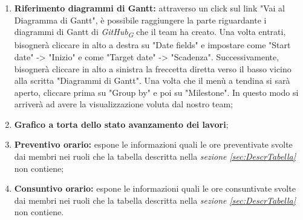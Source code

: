 \begin{enumerate}
    \item \textbf{Riferimento diagrammi di Gantt:} attraverso un click sul link "Vai al Diagramma di Gantt", è possibile raggiungere la parte riguardante i diagrammi di Gantt di \textit{GitHub}\textsubscript{\textit{G}} che il team ha creato. Una volta entrati, bisognerà cliccare in alto a destra su "Date fields" e impostare come "Start date" -> "Inizio" e come "Target date" -> "Scadenza". Successivamente, bisognerà cliccare in alto a sinistra la freccetta diretta verso il basso vicino alla scritta "Diagrammi di Gantt". Una volta che il menù a tendina si sarà aperto, cliccare prima su "Group by" e poi su "Milestone". In questo modo si arriverà ad avere la visualizzazione voluta dal nostro team;
    \item \textbf{Grafico a torta dello stato avanzamento dei lavori};
    \item \textbf{Preventivo orario:} espone le informazioni quali le ore preventivate svolte dai membri nei ruoli che la tabella descritta nella \textit{sezione \ref{sec:DescrTabella}} non contiene; 
    \item \textbf{Consuntivo orario:} espone le informazioni quali le ore consuntivate svolte dai membri nei ruoli che la tabella descritta nella \textit{sezione \ref{sec:DescrTabella}} non contiene. 
\end{enumerate}
